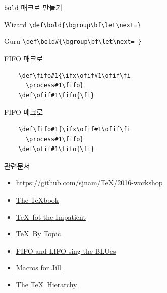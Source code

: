 \documentclass{beamer}
\begin{document}
%
\begin{frame}[fragile]{\texttt{bold} 매크로 만들기}
  \begin{alertblock}{Wizard}
    \verb+\def\bold{\bgroup\bf\let\next=}+
  \end{alertblock}
  \medskip
  \begin{exampleblock}{Guru}
    \verb+\def\bold#{\bgroup\bf\let\next= }+
  \end{exampleblock}
\end{frame}


%
\begin{frame}[fragile]{FIFO 매크로}
  \large
  \begin{verbatim}
    \def\fifo#1{\ifx\ofif#1\ofif\fi
      \process#1\fifo}
    \def\ofif#1\fifo{\fi}
  \end{verbatim}
\end{frame}


%
\begin{frame}[fragile]{FIFO 매크로}
  \large
  \begin{verbatim}
    \def\fifo#1{\ifx\ofif#1\ofif\fi
      \process#1\fifo}
    \def\ofif#1\fifo{\fi}
  \end{verbatim}
\end{frame}


%
\begin{frame}{관련문서}
  \begin{itemize}
  \item \url{https://github.com/sjnam/TeX/2016-workshop}
  \item \href{http://ftp.ktug.org/tex-archive/systems/knuth/dist/tex/}
    {The \TeX book}
  \item \href{http://ftp.ktug.org/tex-archive/info/impatient/book.pdf}
    {\TeX\ fot the Impatient}
  \item \href{http://ftp.ktug.org/tex-archive/info/texbytopic/TeXbyTopic.pdf}
    {\TeX\ By Topic}
  \item \href{https://www.tug.org/TUGboat/tb14-1/tb38laan.pdf}
    {FIFO and LIFO sing the BLUes}
  \item \href{https://www.tug.org/TUGboat/tb08-3/tb19knut.pdf}
    {Macros for Jill}
  \item \href{https://www.tug.org/TUGboat/tb15-1/tb42arseneau.pdf}
    {The TeX\ Hierarchy}
  \end{itemize}
\end{frame}


%
\end{document}
